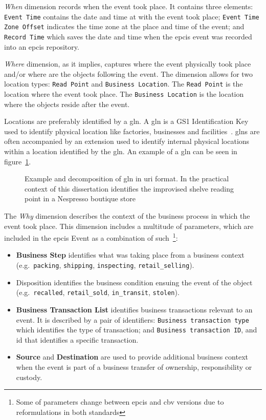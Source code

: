 \emph{When} dimension records when the event took place. It contains three elements: \texttt{Event Time} contains the date and time at with the event took place; \texttt{Event Time Zone Offset} indicates the time zone at the place and time of the event; and \texttt{Record Time} which saves the date and time when the \ac{epcis} event was recorded into an \ac{epcis} repository.

\emph{Where} dimension, as it implies, captures where the event physically took place and/or where are the objects following the event. The dimension allows for two location types: \texttt{Read Point} and \texttt{Business Location}.
The \texttt{Read Point} is the location where the event took place. The \texttt{Business Location} is the location where the objects reside after the event.

Locations are preferably identified by a \ac{gln}. A \ac{gln} is a GS1 Identification Key used to identify physical location like factories, businesses and facilities~\cite{GS1KeysImplementation}. \acp{gln} are often accompanied by an extension used to identify internal physical locations within a location identified by the \ac{gln}. An example of a \ac{gln} can be seen in figure~\ref{fig:gln}. 

\begin{figure}[]
    \centering
    \caption{Example and decomposition of \ac{gln} in \ac{uri} format. In the practical context of this dissertation identifies the improvised shelve reading point in a Nespresso boutique store} 
    \label{fig:gln}
\end{figure}

The \emph{Why} dimension describes the context of the business process in which the event took place.
This dimension includes a multitude of parameters, which are included in the \ac{epcis} Event as a combination of such~\footnote{Some of parameters change between \ac{epcis} and \ac{cbv} versions due to reformulations in both standards}:

\begin{itemize}
    \item \textbf{Business Step} identifies what was taking place from a business context (e.g.\ \texttt{packing}, \texttt{shipping}, \texttt{inspecting}, \texttt{retail\_selling}).
    \item \textbf{}{Disposition} identifies the business condition ensuing the event of the object (e.g.\ \texttt{recalled}, \texttt{retail\_sold}, \texttt{in\_transit}, \texttt{stolen}).
    \item \textbf{Business Transaction List} identifies business transactions relevant to an event. It is described by a pair of identifiers: \texttt{Business transaction type} which identifies the type of transaction; and \texttt{Business transaction ID}, and \ac{id} that identifies a specific transaction.
    \item \textbf{Source} and \textbf{Destination} are used to provide additional business context when the event is part of a business transfer of ownership, responsibility or custody.
\end{itemize}

